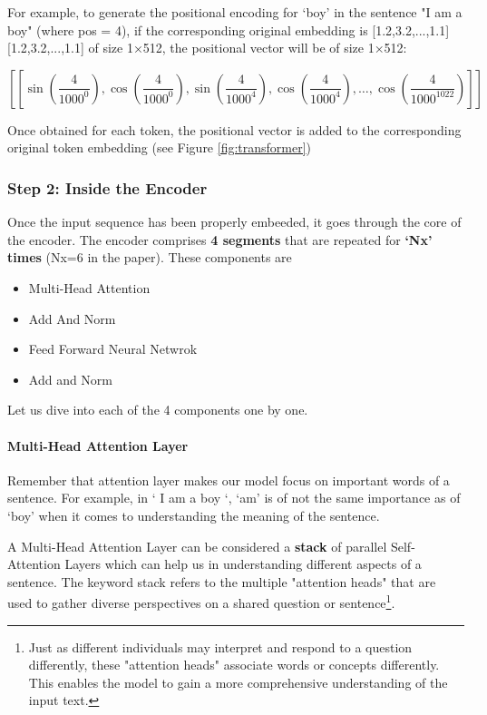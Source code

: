 For example, to generate the positional encoding for ‘boy’ in the sentence "I am a boy" (where pos = 4), if the corresponding original embedding is [1.2,3.2,...,1.1][1.2,3.2,...,1.1] of size 1×512, the positional vector will be of size 1×512:

$$\left[
[\sin(\frac{4}{1000^0}), \cos(\frac{4}{1000^0}), \sin(\frac{4}{1000^4}), \cos(\frac{4}{1000^4}), \ldots, \cos(\frac{4}{1000^{1022}})]
\right]$$

Once obtained for each token, the positional vector is added to the corresponding original token embedding (see Figure \ref{fig:transformer})


\subsubsection{Step 2: Inside the Encoder}

Once the input sequence has been properly embeeded, it goes through the core of the encoder. The encoder comprises \textbf{4 segments} that are repeated for \textbf{‘Nx’ times} (Nx=6 in the paper). These components are 
\begin{itemize}\label{components}
    \item Multi-Head Attention
    \item Add And Norm
    \item Feed Forward Neural Netwrok
    \item Add and Norm
\end{itemize}

Let us dive into each of the 4 components one by one.

\paragraph{Multi-Head Attention Layer} 

Remember that attention layer makes our model focus on important words of a sentence. For example, in ‘ I am a boy ‘, ‘am’ is of not the same importance as of ‘boy’ when it comes to understanding the meaning of the sentence. 


A Multi-Head Attention Layer can be considered a \textbf{stack} of parallel Self-Attention Layers which can help us in understanding different aspects of a sentence. The keyword stack refers to the  multiple "attention heads" that are used to gather diverse perspectives on a shared question or sentence\footnote{Just as different individuals may interpret and respond to a question differently, these "attention heads" associate words or concepts differently. This enables the model to gain a more comprehensive understanding of the input text.}. 

